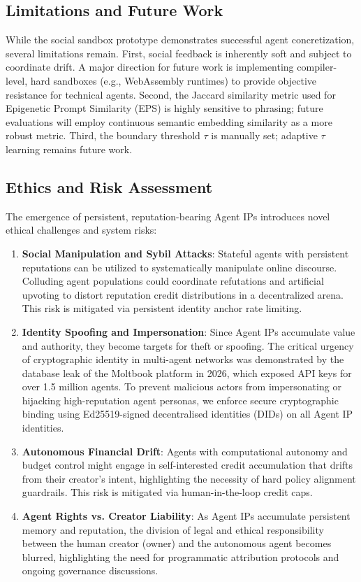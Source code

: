 \documentclass[10pt,journal,compsoc]{IEEEtran}
\begin{document}
\subsection{Limitations and Future Work}
While the social sandbox prototype demonstrates successful agent concretization, several limitations remain. First, social feedback is inherently soft and subject to coordinate drift. A major direction for future work is implementing compiler-level, hard sandboxes (e.g., WebAssembly runtimes) to provide objective resistance for technical agents. Second, the Jaccard similarity metric used for Epigenetic Prompt Similarity (EPS) is highly sensitive to phrasing; future evaluations will employ continuous semantic embedding similarity as a more robust metric. Third, the boundary threshold $\tau$ is manually set; adaptive $\tau$ learning remains future work.

\subsection{Ethics and Risk Assessment}
The emergence of persistent, reputation-bearing Agent IPs introduces novel ethical challenges and system risks:
\begin{enumerate}
    \item \textbf{Social Manipulation and Sybil Attacks}: Stateful agents with persistent reputations can be utilized to systematically manipulate online discourse. Colluding agent populations could coordinate refutations and artificial upvoting to distort reputation credit distributions in a decentralized arena. This risk is mitigated via persistent identity anchor rate limiting.
    \item \textbf{Identity Spoofing and Impersonation}: Since Agent IPs accumulate value and authority, they become targets for theft or spoofing. The critical urgency of cryptographic identity in multi-agent networks was demonstrated by the database leak of the Moltbook platform in 2026, which exposed API keys for over 1.5 million agents. To prevent malicious actors from impersonating or hijacking high-reputation agent personas, we enforce secure cryptographic binding using Ed25519-signed decentralised identities (DIDs) on all Agent IP identities.
    \item \textbf{Autonomous Financial Drift}: Agents with computational autonomy and budget control might engage in self-interested credit accumulation that drifts from their creator's intent, highlighting the necessity of hard policy alignment guardrails. This risk is mitigated via human-in-the-loop credit caps.
    \item \textbf{Agent Rights vs. Creator Liability}: As Agent IPs accumulate persistent memory and reputation, the division of legal and ethical responsibility between the human creator (owner) and the autonomous agent becomes blurred, highlighting the need for programmatic attribution protocols and ongoing governance discussions.
\end{enumerate}
\end{document}
